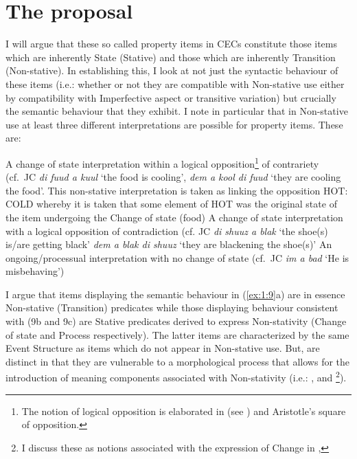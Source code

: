 \section{The proposal}\label{sec:1.6}

I will argue that these so called property items in CECs constitute
those items which are inherently State (Stative) and those which are
inherently Transition (Non-stative).  In establishing this, I look at
not just the syntactic behaviour of these items (i.e.: whether or not
they are compatible with Non-stative use either by compatibility with
Imperfective aspect or transitive variation) but crucially the
semantic behaviour that they exhibit.  I note in particular that in
Non-stative use at least three different interpretations are possible
for property items. These are:

\ea\label{ex:1:9}
  \ea A change of state interpretation within a logical opposition\footnote{The
    notion of logical opposition is elaborated in  (see
  \citealt{Horn1989}) and Aristotle's square of opposition.} of contrariety
  (cf.\ JC \textit{di fuud a kuul} `the food is cooling', \textit{dem a kool di
  fuud} `they are cooling the food'.  This non-stative interpretation is taken
  as linking the opposition HOT: COLD whereby it is taken that some element of
  HOT was the original state of the item undergoing the Change of state (food)
  \ex A change of state interpretation with a logical opposition of
  contradiction (cf. JC \textit{di shuuz a blak} `the shoe(s) is\slash are getting
  black' \textit{dem a blak di shuuz} `they are blackening the shoe(s)'
  \ex An ongoing\slash processual interpretation with no change of state (cf.\ JC
  \textit{im a bad} `He is misbehaving')
  \z
\z

I argue that items displaying the semantic behaviour in (\ref{ex:1:9}a) are in
essence Non-stative (Transition) predicates while those displaying behaviour
consistent with (9b and 9c) are Stative predicates derived to express
Non-stativity (Change of state and Process respectively).  The latter items are
characterized by the same Event Structure as items which do not appear in
Non-stative use.  But, are distinct in that they are vulnerable to a
morphological process that allows for the introduction of meaning components
associated with Non-stativity (i.e.: \CAUSE, \BECOME and \DO\footnote{I discuss
these as notions associated with the expression of Change in ,
}).

